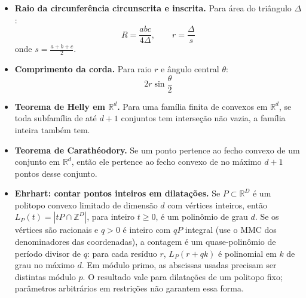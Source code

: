 \begin{itemize}[leftmargin=*,label={}]
	\item \textbf{Raio da circunferência circunscrita e inscrita.}
		Para área do triângulo $\Delta$:
		\[
			R=\frac{abc}{4\Delta},\qquad r=\frac{\Delta}{s}
		\]
		onde $s=\frac{a+b+c}{2}$.

		\ifextended
	\item \textbf{Comprimento da corda.}
		Para raio $r$ e ângulo central $\theta$:
		\[
			2r\sin\frac{\theta}{2}
		\]
		\fi

	\item \textbf{Teorema de Helly em $\mathbb{R}^d$.}
		Para uma família finita de convexos em $\mathbb{R}^d$, se toda subfamília de até $d+1$ conjuntos tem interseção não vazia, a família inteira também tem.

		\ifextended
	\item \textbf{Teorema de Carathéodory.}
		Se um ponto pertence ao fecho convexo de um conjunto em $\mathbb{R}^d$, então ele pertence ao fecho convexo de no máximo $d+1$ pontos desse conjunto.
		\fi

\ifextended
\item \textbf{Ehrhart: contar pontos inteiros em dilatações.}
Se $P\subset\mathbb R^D$ é um politopo convexo limitado de dimensão $d$ com vértices inteiros, então $L_P(t)=|tP\cap\mathbb Z^D|$, para inteiro $t\ge0$, é um polinômio de grau $d$. Se os vértices são racionais e $q>0$ é inteiro com $qP$ integral (use o MMC dos denominadores das coordenadas), a contagem é um quase-polinômio de período divisor de $q$: para cada resíduo $r$, $L_P(r+qk)$ é polinomial em $k$ de grau no máximo $d$. Em módulo primo, as abscissas usadas precisam ser distintas módulo $p$. O resultado vale para dilatações de um politopo fixo; parâmetros arbitrários em restrições não garantem essa forma.
\fi
\end{itemize}

